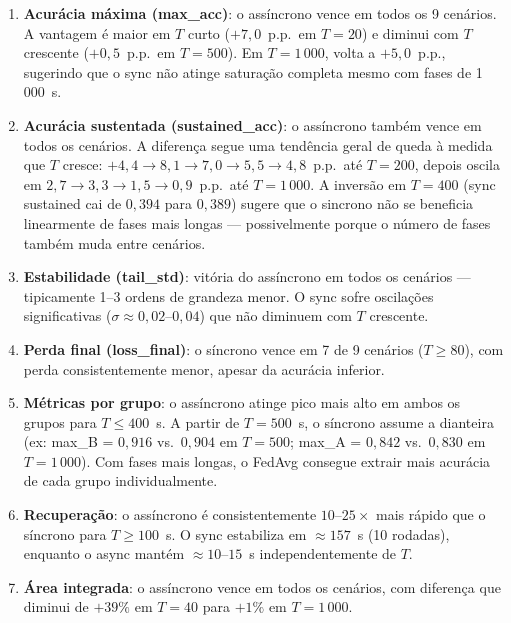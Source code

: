 \documentclass[12pt, a4paper]{article}
\begin{document}
\begin{enumerate}
    \item \textbf{Acurácia máxima (max\_acc)}: o assíncrono vence em todos os
    9 cenários. A vantagem é maior em $T$ curto ($+7{,}0$~p.p.\ em $T = 20$)
    e diminui com $T$ crescente ($+0{,}5$~p.p.\ em $T = 500$). Em
    $T = 1\,000$, volta a $+5{,}0$~p.p., sugerindo que o sync não atinge
    saturação completa mesmo com fases de 1\,000~s.

    \item \textbf{Acurácia sustentada (sustained\_acc)}: o assíncrono também
    vence em todos os cenários. A diferença segue uma tendência geral de
    queda à medida que $T$ cresce:
    $+4{,}4 \to 8{,}1 \to 7{,}0 \to 5{,}5 \to 4{,}8$~p.p.\ at\'e
    $T = 200$, depois oscila em $2{,}7 \to 3{,}3 \to 1{,}5 \to
    0{,}9$~p.p.\ até $T = 1\,000$. A inversão em $T = 400$ (sync
    sustained cai de $0{,}394$ para $0{,}389$) sugere que o sincrono
    não se beneficia linearmente de fases mais longas --- possivelmente
    porque o n\'umero de fases também muda entre cenários.

    \item \textbf{Estabilidade (tail\_std)}: vitória do assíncrono em todos os
    cenários --- tipicamente 1--3 ordens de grandeza menor. O sync sofre
    oscilações significativas ($\sigma \approx 0{,}02$--$0{,}04$) que não
    diminuem com $T$ crescente.

    \item \textbf{Perda final (loss\_final)}: o síncrono vence em 7 de 9
    cenários ($T \geq 80$), com perda consistentemente menor, apesar da
    acurácia inferior.

    \item \textbf{Métricas por grupo}: o assíncrono atinge pico mais alto em
    ambos os grupos para $T \leq 400$~s. A partir de $T = 500$~s, o síncrono
    assume a dianteira (ex: max\_B = $0{,}916$ vs.\ $0{,}904$ em $T = 500$;
    max\_A = $0{,}842$ vs.\ $0{,}830$ em $T = 1\,000$). Com fases mais longas,
    o FedAvg consegue extrair mais acurácia de cada grupo individualmente.

    \item \textbf{Recuperação}: o assíncrono é consistentemente $10$--$25{\times}$
    mais rápido que o síncrono para $T \geq 100$~s. O sync estabiliza em
    $\approx 157$~s (10 rodadas), enquanto o async mantém $\approx 10$--$15$~s
    independentemente de $T$.

    \item \textbf{Área integrada}: o assíncrono vence em todos os cenários,
    com diferença que diminui de $+39\%$ em $T = 40$ para $+1\%$ em
    $T = 1\,000$.
\end{enumerate}
\end{document}
